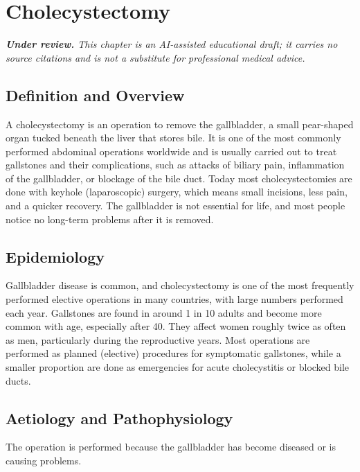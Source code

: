 \chapter{Cholecystectomy}

\medskip
\noindent\textit{\textbf{Under review.} This chapter is an AI-assisted educational draft; it carries no source citations and is not a substitute for professional medical advice.}

\section*{Definition and Overview}
A cholecystectomy is an operation to remove the gallbladder, a small pear-shaped organ tucked beneath the liver that stores bile. It is one of the most commonly performed abdominal operations worldwide and is usually carried out to treat gallstones and their complications, such as attacks of biliary pain, inflammation of the gallbladder, or blockage of the bile duct. Today most cholecystectomies are done with keyhole (laparoscopic) surgery, which means small incisions, less pain, and a quicker recovery. The gallbladder is not essential for life, and most people notice no long-term problems after it is removed.

\section*{Epidemiology}
Gallbladder disease is common, and cholecystectomy is one of the most frequently performed elective operations in many countries, with large numbers performed each year. Gallstones are found in around 1 in 10 adults and become more common with age, especially after 40. They affect women roughly twice as often as men, particularly during the reproductive years. Most operations are performed as planned (elective) procedures for symptomatic gallstones, while a smaller proportion are done as emergencies for acute cholecystitis or blocked bile ducts.

\section*{Aetiology and Pathophysiology}
The operation is performed because the gallbladder has become diseased or is causing problems.

